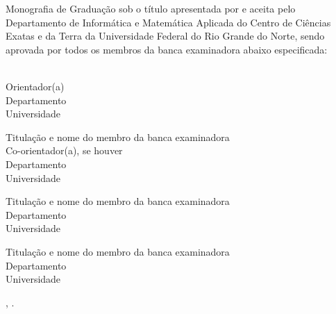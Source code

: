 \begin{folhadeaprovacao}
  \setlength{\ABNTEXsignthickness}{0.4pt}
  \setlength{\ABNTEXsignwidth}{10cm}
  \setlength{\ABNTEXsignskip}{2.5cm}

  \noindent
  Monografia de Graduação sob o título \textit{\imprimirtitulo} apresentada por \imprimirautor e aceita pelo Departamento de Informática e Matemática Aplicada do Centro de Ciências Exatas e da Terra da Universidade Federal do Rio Grande do Norte, sendo aprovada por todos os membros da banca examinadora abaixo especificada:

  \assinatura
  {
    \imprimirorientador\\
    {\small Orientador(a)}\\
    {\footnotesize
      Departamento\\
      Universidade
    }
  }

  \assinatura
  {
    Titulação e nome do membro da banca examinadora\\
    {\small Co-orientador(a), se houver}\\
    {\footnotesize
      Departamento\\
      Universidade
    }
  }

  \assinatura
  {
    Titulação e nome do membro da banca examinadora\\
    {\footnotesize
      Departamento\\
      Universidade
    }
  }

  \assinatura
  {
    Titulação e nome do membro da banca examinadora\\
    {\footnotesize
      Departamento\\
      Universidade
    }
  }

  \vfill

  \begin{center}
    \imprimirlocal, \imprimirdatadaaprovacao.
  \end{center}
\end{folhadeaprovacao}
